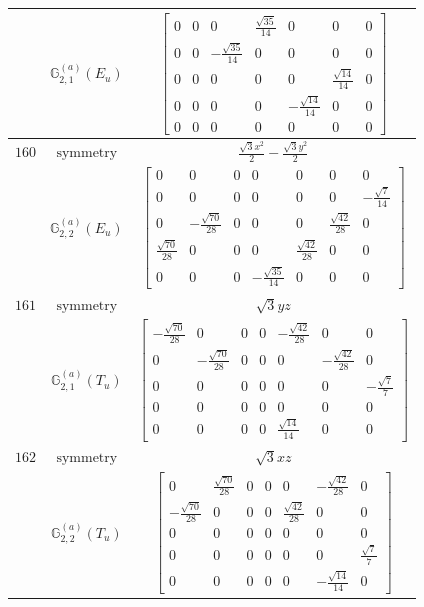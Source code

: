 \documentclass[fleqn,8pt,landscape]{jsarticle}
\begin{document}
\begin{longtable}{ccc}
$  $ & $ \mathbb{G}_{2,1}^{(a)}(E_{u}) $ & $ \begin{bmatrix} 0 & 0 & 0 & \frac{\sqrt{35}}{14} & 0 & 0 & 0 \\ 0 & 0 & - \frac{\sqrt{35}}{14} & 0 & 0 & 0 & 0 \\ 0 & 0 & 0 & 0 & 0 & \frac{\sqrt{14}}{14} & 0 \\ 0 & 0 & 0 & 0 & - \frac{\sqrt{14}}{14} & 0 & 0 \\ 0 & 0 & 0 & 0 & 0 & 0 & 0 \end{bmatrix} $ \\ \hline
$ 160 $ & $ \text{symmetry} $ & $ \frac{\sqrt{3} x^{2}}{2} - \frac{\sqrt{3} y^{2}}{2} $ \\
$  $ & $ \mathbb{G}_{2,2}^{(a)}(E_{u}) $ & $ \begin{bmatrix} 0 & 0 & 0 & 0 & 0 & 0 & 0 \\ 0 & 0 & 0 & 0 & 0 & 0 & - \frac{\sqrt{7}}{14} \\ 0 & - \frac{\sqrt{70}}{28} & 0 & 0 & 0 & \frac{\sqrt{42}}{28} & 0 \\ \frac{\sqrt{70}}{28} & 0 & 0 & 0 & \frac{\sqrt{42}}{28} & 0 & 0 \\ 0 & 0 & 0 & - \frac{\sqrt{35}}{14} & 0 & 0 & 0 \end{bmatrix} $ \\ \hline
$ 161 $ & $ \text{symmetry} $ & $ \sqrt{3} y z $ \\
$  $ & $ \mathbb{G}_{2,1}^{(a)}(T_{u}) $ & $ \begin{bmatrix} - \frac{\sqrt{70}}{28} & 0 & 0 & 0 & - \frac{\sqrt{42}}{28} & 0 & 0 \\ 0 & - \frac{\sqrt{70}}{28} & 0 & 0 & 0 & - \frac{\sqrt{42}}{28} & 0 \\ 0 & 0 & 0 & 0 & 0 & 0 & - \frac{\sqrt{7}}{7} \\ 0 & 0 & 0 & 0 & 0 & 0 & 0 \\ 0 & 0 & 0 & 0 & \frac{\sqrt{14}}{14} & 0 & 0 \end{bmatrix} $ \\ \hline
$ 162 $ & $ \text{symmetry} $ & $ \sqrt{3} x z $ \\
$  $ & $ \mathbb{G}_{2,2}^{(a)}(T_{u}) $ & $ \begin{bmatrix} 0 & \frac{\sqrt{70}}{28} & 0 & 0 & 0 & - \frac{\sqrt{42}}{28} & 0 \\ - \frac{\sqrt{70}}{28} & 0 & 0 & 0 & \frac{\sqrt{42}}{28} & 0 & 0 \\ 0 & 0 & 0 & 0 & 0 & 0 & 0 \\ 0 & 0 & 0 & 0 & 0 & 0 & \frac{\sqrt{7}}{7} \\ 0 & 0 & 0 & 0 & 0 & - \frac{\sqrt{14}}{14} & 0 \end{bmatrix} $ \\ \hline

\end{longtable}
\end{document}

